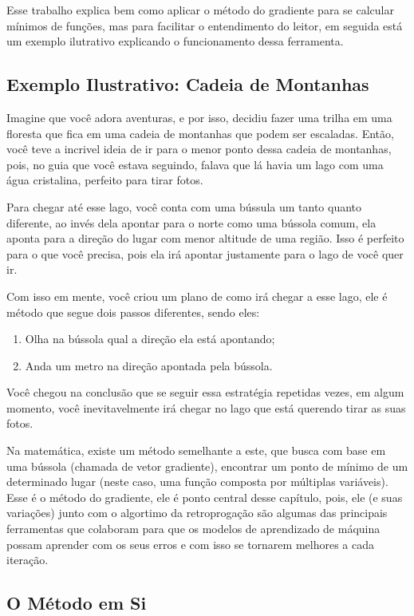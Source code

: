Esse trabalho explica bem como aplicar o método do gradiente para se calcular mínimos de funções, mas para facilitar o entendimento do leitor, em seguida está um exemplo ilutrativo explicando o funcionamento dessa ferramenta.

\subsection{Exemplo Ilustrativo: Cadeia de Montanhas}

Imagine que você adora aventuras, e por isso, decidiu fazer uma trilha em uma floresta que fica em uma cadeia de montanhas que podem ser escaladas. Então, você teve a incrivel ideia de ir para o menor ponto dessa cadeia de montanhas, pois, no guia que você estava seguindo, falava que lá havia um lago com uma água cristalina, perfeito para tirar fotos.

Para chegar até esse lago, você conta com uma bússula um tanto quanto diferente, ao invés dela apontar para o norte como uma bússola comum, ela aponta para a direção do lugar com menor altitude de uma região. Isso é perfeito para o que você precisa, pois ela irá apontar justamente para o lago de você quer ir.

Com isso em mente, você criou um plano de como irá chegar a esse lago, ele é método que segue dois passos diferentes, sendo eles:

\begin{enumerate}
    \item Olha na bússola qual a direção ela está apontando;
    \item Anda um metro na direção apontada pela bússola.
\end{enumerate}

Você chegou na conclusão que se seguir essa estratégia repetidas vezes, em algum momento, você inevitavelmente irá chegar no lago que está querendo tirar as suas fotos.

Na matemática, existe um método semelhante a este, que busca com base em uma bússola (chamada de vetor gradiente), encontrar um ponto de mínimo de um determinado lugar (neste caso, uma função composta por múltiplas variáveis). Esse é o método do gradiente, ele é ponto central desse capítulo, pois, ele (e suas variações) junto com o algortimo da retroprogação são algumas das principais ferramentas que colaboram para que os modelos de aprendizado de máquina possam aprender com os seus erros e com isso se tornarem melhores a cada iteração.

\subsection{O Método em Si}

